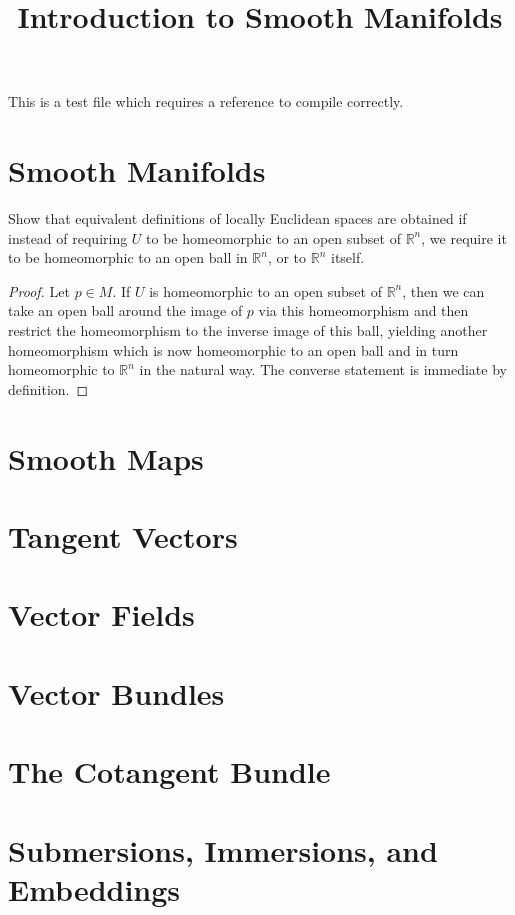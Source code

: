 


%


\title{Introduction to Smooth Manifolds}


\maketitle

\label{section-phantom}

\tableofcontents

This is a test file which requires a reference to compile correctly. \cite{Maclane}

\section{Smooth Manifolds}
\label{section-smooth-manifolds}

\begin{exercise}
\label{sm-exercise-1-1}
Show that equivalent definitions of locally Euclidean spaces are obtained if
instead of requiring $U$ to be homeomorphic to an open subset of $\mathbb R^n$,
we require it to be homeomorphic to an open ball in $\mathbb R^n$, or to
$\mathbb R^n$ itself.
\end{exercise}

\begin{proof}
Let $p \in M$. If $U$ is homeomorphic to an open subset of $\mathbb R^n$, then
we can take an open ball around the image of $p$ via this homeomorphism and
then restrict the homeomorphism to the inverse image of this ball, yielding
another homeomorphism which is now homeomorphic to an open ball and in turn
homeomorphic to $\mathbb R^n$ in the natural way. The converse statement is
immediate by definition.
\end{proof}

\section{Smooth Maps}
\label{section-smooth-maps}

\section{Tangent Vectors}
\label{section-tangent-vectors}

\section{Vector Fields}
\label{section-vector-fields}

\section{Vector Bundles}
\label{section-vector-bundles}

\section{The Cotangent Bundle}
\label{section-cotangent-bundle}

\section{Submersions, Immersions, and Embeddings}
\label{section-submersions-immersions-embeddings}








